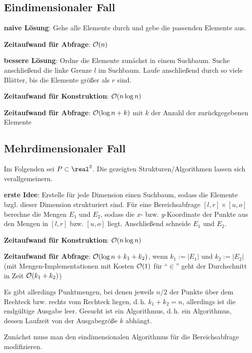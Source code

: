 \subsection{%
    Eindimensionaler Fall%
}

\textbf{naive Lösung}:
Gehe alle Elemente durch und gebe die passenden Elemente aus.

\textbf{Zeitaufwand für Abfrage}:
$\mathcal{O}(n)$

\linie

\textbf{bessere Lösung}:
Ordne die Elemente zunächst in einem Suchbaum.
Suche anschließend die linke Grenze $l$ im Suchbaum.
Laufe anschließend durch so viele Blätter, bis die Elemente größer als $r$ sind.

\textbf{Zeitaufwand für Konstruktion}:
$\mathcal{O}(n \log n)$

\textbf{Zeitaufwand für Abfrage}:
$\mathcal{O}(\log n + k)$ mit $k$ der Anzahl der zurückgegebenen Elemente

\subsection{%
    Mehrdimensionaler Fall%
}

Im Folgenden sei $P \subset \real^2$.
Die gezeigten Strukturen/Algorithmen lassen sich verallgemeinern.

\textbf{erste Idee}:
Erstelle für jede Dimension einen Suchbaum, sodass die Elemente bzgl. dieser Dimension
strukturiert sind.
Für eine Bereichsabfrage $[l, r] \times [u, o]$ berechne die Mengen $E_1$ und $E_2$,
sodass die $x$- bzw. $y$-Koordinate der Punkte aus den Mengen in $[l, r]$ bzw. $[u, o]$ liegt.
Anschließend schneide $E_1$ und $E_2$.

\textbf{Zeitaufwand für Konstruktion}:
$\mathcal{O}(n \log n)$

\textbf{Zeitaufwand für Abfrage}:
$\mathcal{O}(\log n + k_1 + k_2)$,
wenn $k_1 := |E_1|$ und $k_2 := |E_2|$
(mit Mengen-Implementationen mit Kosten $\mathcal{O}(1)$ für "`$\in$"' geht der Durchschnitt in
Zeit $\mathcal{O}(k_1 + k_2)$)

Es gibt allerdings Punktmengen, bei denen jeweils $n/2$ der Punkte über dem Rechteck bzw.
rechts vom Rechteck liegen,
d.\,h. $k_1 + k_2 = n$, allerdings ist die endgültige Ausgabe leer.
Gesucht ist ein  Algorithmus,
d.\,h. ein Algorithmus, dessen Laufzeit von der Ausgabegröße $k$ abhängt.

\linie

Zunächst muss man den eindimensionalen Algorithmus für die Bereichsabfrage modifizieren.

